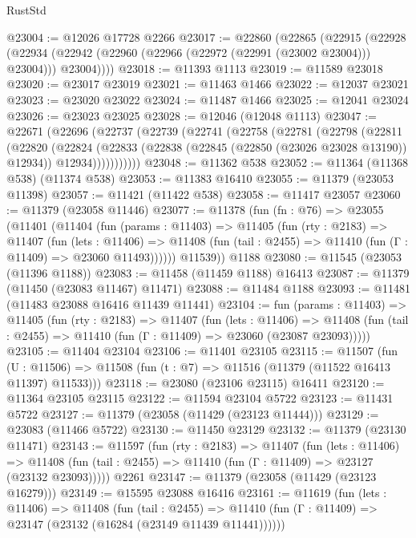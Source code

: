 \begin{lexlean}{RustStd}
\begin{coremodule}
@23004 := @12026 @17728 @2266
@23017 := @22860
    (@22865
      (@22915
        (@22928
          (@22934 (@22942 (@22960 (@22966 (@22972 (@22991 (@23002 @23004))) @23004))) @23004))))
@23018 := @11393 @1113
@23019 := @11589 @23018
@23020 := @23017 @23019
@23021 := @11463 @1466
@23022 := @12037 @23021
@23023 := @23020 @23022
@23024 := @11487 @1466
@23025 := @12041 @23024
@23026 := @23023 @23025
@23028 := @12046 (@12048 @1113)
@23047 := @22671
    (@22696
      (@22737
        (@22739
          (@22741
            (@22758
              (@22781
                (@22798
                  (@22811
                    (@22820
                      (@22824
                        (@22833
                          (@22838 (@22845 (@22850 (@23026 @23028 @13190)) @12934))
                          @12934)))))))))))
@23048 := @11362 @538
@23052 := @11364 (@11368 @538) (@11374 @538)
@23053 := @11383 @16410
@23055 := @11379 (@23053 @11398)
@23057 := @11421 (@11422 @538)
@23058 := @11417 @23057
@23060 := @11379 (@23058 @11446)
@23077 := @11378
    (fun (fn : @76) =>
    @23055
      (@11401
        (@11404
          (fun (params : @11403) =>
          @11405
            (fun (rty : @2183) =>
            @11407
              (fun (lets : @11406) =>
              @11408 (fun (tail : @2455) => @11410 (fun (Γ : @11409) => @23060 @11493))))))
        @11539))
    @1188
@23080 := @11545 (@23053 (@11396 @1188))
@23083 := @11458 (@11459 @1188) @16413
@23087 := @11379 (@11450 (@23083 @11467) @11471)
@23088 := @11484 @1188
@23093 := @11481 (@11483 @23088 @16416 @11439 @11441)
@23104 := fun (params : @11403) =>
  @11405
    (fun (rty : @2183) =>
    @11407
      (fun (lets : @11406) =>
      @11408 (fun (tail : @2455) => @11410 (fun (Γ : @11409) => @23060 (@23087 @23093)))))
@23105 := @11404 @23104
@23106 := @11401 @23105
@23115 := @11507
    (fun (U : @11506) => @11508 (fun (t : @7) => @11516 (@11379 (@11522 @16413 @11397) @11533)))
@23118 := @23080 (@23106 @23115) @16411
@23120 := @11364 @23105 @23115
@23122 := @11594 @23104 @5722
@23123 := @11431 @5722
@23127 := @11379 (@23058 (@11429 (@23123 @11444)))
@23129 := @23083 (@11466 @5722)
@23130 := @11450 @23129
@23132 := @11379 (@23130 @11471)
@23143 := @11597
    (fun (rty : @2183) =>
    @11407
      (fun (lets : @11406) =>
      @11408 (fun (tail : @2455) => @11410 (fun (Γ : @11409) => @23127 (@23132 @23093)))))
    @2261
@23147 := @11379 (@23058 (@11429 (@23123 @16279)))
@23149 := @15595 @23088 @16416
@23161 := @11619
    (fun (lets : @11406) =>
    @11408
      (fun (tail : @2455) =>
      @11410 (fun (Γ : @11409) => @23147 (@23132 (@16284 (@23149 @11439 @11441))))))

\end{coremodule}
\end{lexlean}
